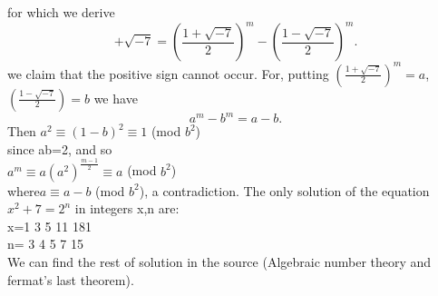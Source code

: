 \documentclass[]{article}
\begin{document}
  for which we derive 
  $$+\sqrt{-7}=(\frac{1+\sqrt{-7}}{2})^m - (\frac{1-\sqrt{-7}}{2})^m.$$ 
  we claim that the positive sign cannot occur. For, putting $(\frac{1+\sqrt{-7}}{2})^m=a$, $(\frac{1-\sqrt{-7}}{2})=b$ we have 
  $$a^m -b^m=a-b.$$
  Then $a^2\equiv(1-b)^2\equiv1$ (mod $b^2$)
  \\  since ab=2, and so 
\\  $a^m\equiv a(a^2)^\frac{m-1}{2}\equiv a $ (mod $b^2$)
 \\ where$a\equiv a-b$ (mod $b^2$),
 a contradiction.
 The only solution of the equation $x^2+7=2^n$ in integers x,n are: 
 \\x=1  3  5  11  181 
 \\n= 3  4  5  7  15
\\ We can find the rest of solution in the source (Algebraic number theory and fermat's last theorem).
\end{document}

